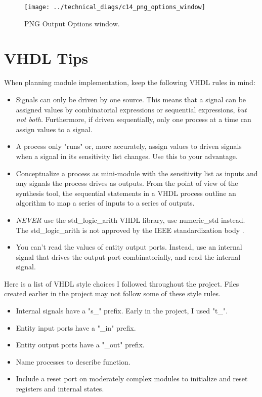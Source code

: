\documentclass[]{report}
\begin{document}
\begin{figure}[h]
	\centering
	\texttt{[image: ../technical\_diags/c14\_png\_options\_window]}
	\caption{PNG Output Options window.}
	\label{fig: png options window}
\end{figure}

\section{VHDL Tips}

When planning module implementation, keep the following VHDL rules in mind:
\begin{itemize}
	\item Signals can only be driven by one source. This means that a signal can be assigned values by combinatorial expressions or sequential expressions, \textit{but not both}. Furthermore, if driven sequentially, only one process at a time can assign values to a signal.
	\item A process only "runs" or, more accurately, assign values to driven signals when a signal in its sensitivity list changes. Use this to your advantage.  
	\item Conceptualize a process as mini-module with the sensitivity list as inputs and any signals the process drives as outputs. From the point of view of the synthesis tool, the sequential statements in a VHDL process outline an algorithm to map a series of inputs to a series of outputs.
	\item \textit{NEVER} use the std\_logic\_arith VHDL library, use numeric\_std instead. The std\_logic\_arith is not approved by the IEEE standardization body \cite{bad library site}.
	\item You can't read the values of entity output ports. Instead, use an internal signal that drives the output port combinatorially, and read the internal signal. 
\end{itemize}

Here is a list of VHDL style choices I followed throughout the project. Files created earlier in the project may not follow some of these style rules.
\begin{itemize}
	\item Internal signals have a "s\_" prefix. Early in the project, I used "t\_".
	\item Entity input ports have a "\_in" prefix.
	\item Entity output ports have a "\_out" prefix.
	\item Name processes to describe function.
	\item Include a reset port on moderately complex modules to initialize and reset registers and internal states.
\end{itemize}
\end{document}
